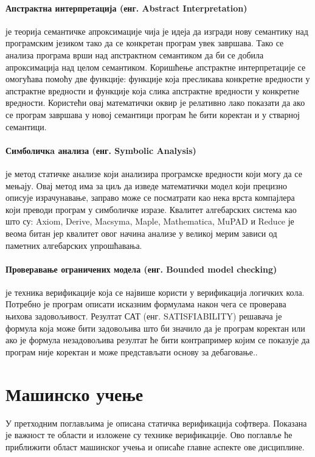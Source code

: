 \documentclass[a4paper]{article}
\begin{document}
{\paragraph{Апстрактна интерпретација (енг.  Abstract Interpretation)} је теорија семантичке апроксимације чија је идеја да изгради нову семантику над програмским језиком тако да се конкретан програм увек завршава. Тако се анализа програма врши над апстрактном семантиком да би се добила апроксимација над целом семантиком. Коришћење апстрактне интерпретације се омогућава помоћу две функције: функције која пресликава конкретне вредности у апстрактне вредности и функције која слика апстрактне вредности у конкретне вредности.  Користећи овај математички оквир је релативно лако показати да ако се програм завршава у новој семантици програм ће бити коректан и у стварној семантици.


\paragraph{Симболичкa анализа (енг. Symbolic Analysis)} је метод статичке анализе који анализира програмске вредности који могу да се мењају. Овај метод има за циљ да изведе математички модел који прецизно описује израчунавање, заправо може се посматрати као нека врста компајлера који преводи програм у симболичке изразе. Квалитет алгебарских система као што су: Axiom, Derive, Macsyma, Maple, Mathematica, MuPAD и Reduce је веома битан јер квалитет овог начина анализе у великој мерим зависи од паметних алгебарских упрошћавања.


\paragraph{Проверавање ограничених модела (енг. Bounded model checking)} је техника верификације која се највише користи у верификација логичких кола. Потребно је програм описати исказним формулама након чега се проверава њихова задовољивост. Резултат САТ (енг. SATISFIABILITY) решавача је формула која може бити задовољива што би значило да је програм коректан или ако је формула незадовољива резултат ће бити контрапример којим се показује да програм није коректан и може представљати основу за дебаговање.\cite{survey, dkw2008}.

\section{Машинско учење}
У претходним поглављима је описана статичка верификација софтвера. Показана је важност те области и изложене су технике верификације. Ово поглавље ће приближити област машинског учења и описаће главне аспекте ове дисциплине.

}
\end{document}
